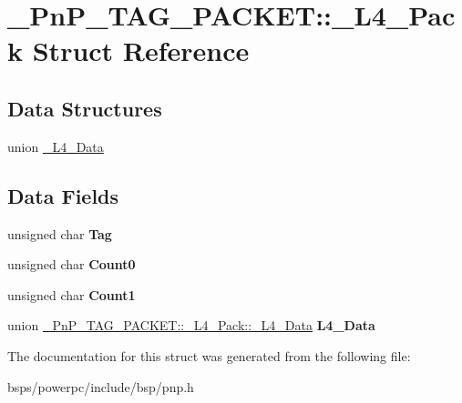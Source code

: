 \hypertarget{struct__PnP__TAG__PACKET_1_1__L4__Pack}{}\section{\+\_\+\+Pn\+P\+\_\+\+T\+A\+G\+\_\+\+P\+A\+C\+K\+ET\+::\+\_\+\+L4\+\_\+\+Pack Struct Reference}
\label{struct__PnP__TAG__PACKET_1_1__L4__Pack}
\subsection*{Data Structures}
\begin{DoxyCompactItemize}
\item 
union \mbox{\hyperlink{union__PnP__TAG__PACKET_1_1__L4__Pack_1_1__L4__Data}{\+\_\+\+L4\+\_\+\+Data}}
\end{DoxyCompactItemize}
\subsection*{Data Fields}
\begin{DoxyCompactItemize}
\item 
\mbox{\label{struct__PnP__TAG__PACKET_1_1__L4__Pack_a7c57e5b28912b26883ad56f6f68699c9}} 
unsigned char {\bfseries Tag}
\item 
\mbox{\label{struct__PnP__TAG__PACKET_1_1__L4__Pack_a23c3200b50d8ea516d3ca5db95f0de65}} 
unsigned char {\bfseries Count0}
\item 
\mbox{\label{struct__PnP__TAG__PACKET_1_1__L4__Pack_a7478e696a3b59aadb8199b1c39ddd520}} 
unsigned char {\bfseries Count1}
\item 
\mbox{\label{struct__PnP__TAG__PACKET_1_1__L4__Pack_ac6e42c22cea0f4a08f8cf3e299575035}} 
union \mbox{\hyperlink{union__PnP__TAG__PACKET_1_1__L4__Pack_1_1__L4__Data}{\+\_\+\+Pn\+P\+\_\+\+T\+A\+G\+\_\+\+P\+A\+C\+K\+E\+T\+::\+\_\+\+L4\+\_\+\+Pack\+::\+\_\+\+L4\+\_\+\+Data}} {\bfseries L4\+\_\+\+Data}
\end{DoxyCompactItemize}


The documentation for this struct was generated from the following file\+:\begin{DoxyCompactItemize}
\item 
bsps/powerpc/include/bsp/pnp.\+h\end{DoxyCompactItemize}
